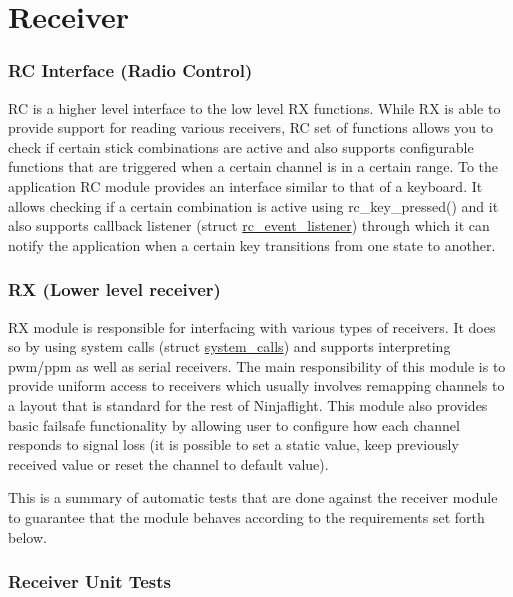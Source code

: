 \hypertarget{group__RX}{\section{Receiver}
\label{group__RX}
}
\subsubsection*{R\+C Interface (Radio Control) }

R\+C is a higher level interface to the low level R\+X functions. While R\+X is able to provide support for reading various receivers, R\+C set of functions allows you to check if certain stick combinations are active and also supports configurable functions that are triggered when a certain channel is in a certain range. To the application R\+C module provides an interface similar to that of a keyboard. It allows checking if a certain combination is active using rc\+\_\+key\+\_\+pressed() and it also supports callback listener (struct \hyperlink{structrc__event__listener}{rc\+\_\+event\+\_\+listener}) through which it can notify the application when a certain key transitions from one state to another.

\subsubsection*{R\+X (Lower level receiver) }

R\+X module is responsible for interfacing with various types of receivers. It does so by using system calls (struct \hyperlink{structsystem__calls}{system\+\_\+calls}) and supports interpreting pwm/ppm as well as serial receivers. The main responsibility of this module is to provide uniform access to receivers which usually involves remapping channels to a layout that is standard for the rest of Ninjaflight. This module also provides basic failsafe functionality by allowing user to configure how each channel responds to signal loss (it is possible to set a static value, keep previously received value or reset the channel to default value).

This is a summary of automatic tests that are done against the receiver module to guarantee that the module behaves according to the requirements set forth below.

\subsubsection*{Receiver Unit Tests }


